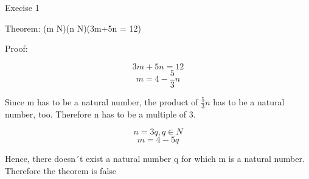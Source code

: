 \documentclass[12pt]{article}
\begin{document}
\maketitle
Execise 1

Theorem: (\exists m \in N)(\exists n \in N)(3m+5n = 12)

Proof: 

\[3m + 5n  = 12\]
\[m = 4 - \frac{5}{3}n\]

Since m has to be a natural number, the product of \(\frac{5}{3}n\) has to be a natural number, too. Therefore n has to be a multiple of 3.

\[n = 3q, q \in N\] 
\[m = 4 - 5q\]

Hence, there doesn´t exist a natural number q for which m is a natural number. Therefore the theorem is false 
\end{document}
